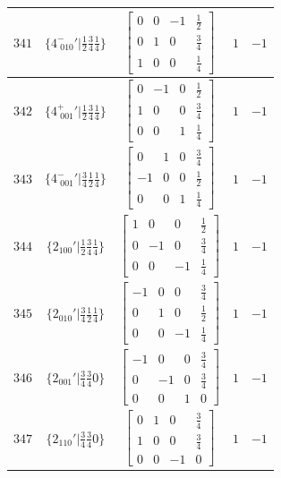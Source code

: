 \documentclass[fleqn,8pt]{jsarticle}
\begin{document}
\begin{longtable}{ccccc}
$ 341 $ & $ \{4^{-}_{\,\,010}{}'|\frac{1}{2} \frac{3}{4} \frac{1}{4}\} $ & $ \begin{bmatrix} 0 & 0 & -1 & \frac{1}{2} \\ 0 & 1 & 0 & \frac{3}{4} \\ 1 & 0 & 0 & \frac{1}{4} \end{bmatrix} $ & $ 1 $ & $ -1 $ \\ \hline
$ 342 $ & $ \{4^{+}_{\,\,001}{}'|\frac{1}{2} \frac{3}{4} \frac{1}{4}\} $ & $ \begin{bmatrix} 0 & -1 & 0 & \frac{1}{2} \\ 1 & 0 & 0 & \frac{3}{4} \\ 0 & 0 & 1 & \frac{1}{4} \end{bmatrix} $ & $ 1 $ & $ -1 $ \\ \hline
$ 343 $ & $ \{4^{-}_{\,\,001}{}'|\frac{3}{4} \frac{1}{2} \frac{1}{4}\} $ & $ \begin{bmatrix} 0 & 1 & 0 & \frac{3}{4} \\ -1 & 0 & 0 & \frac{1}{2} \\ 0 & 0 & 1 & \frac{1}{4} \end{bmatrix} $ & $ 1 $ & $ -1 $ \\ \hline
$ 344 $ & $ \{2{}_{100}{}'|\frac{1}{2} \frac{3}{4} \frac{1}{4}\} $ & $ \begin{bmatrix} 1 & 0 & 0 & \frac{1}{2} \\ 0 & -1 & 0 & \frac{3}{4} \\ 0 & 0 & -1 & \frac{1}{4} \end{bmatrix} $ & $ 1 $ & $ -1 $ \\ \hline
$ 345 $ & $ \{2{}_{010}{}'|\frac{3}{4} \frac{1}{2} \frac{1}{4}\} $ & $ \begin{bmatrix} -1 & 0 & 0 & \frac{3}{4} \\ 0 & 1 & 0 & \frac{1}{2} \\ 0 & 0 & -1 & \frac{1}{4} \end{bmatrix} $ & $ 1 $ & $ -1 $ \\ \hline
$ 346 $ & $ \{2{}_{001}{}'|\frac{3}{4} \frac{3}{4} 0\} $ & $ \begin{bmatrix} -1 & 0 & 0 & \frac{3}{4} \\ 0 & -1 & 0 & \frac{3}{4} \\ 0 & 0 & 1 & 0 \end{bmatrix} $ & $ 1 $ & $ -1 $ \\ \hline
$ 347 $ & $ \{2{}_{110}{}'|\frac{3}{4} \frac{3}{4} 0\} $ & $ \begin{bmatrix} 0 & 1 & 0 & \frac{3}{4} \\ 1 & 0 & 0 & \frac{3}{4} \\ 0 & 0 & -1 & 0 \end{bmatrix} $ & $ 1 $ & $ -1 $ \\ \hline

\end{longtable}
\end{document}
